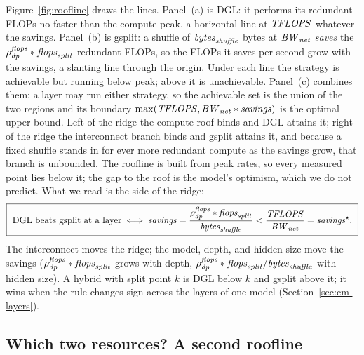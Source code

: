 Figure~\ref{fig:roofline} draws the lines. Panel~(a) is DGL: it performs its redundant FLOPs no
faster than the compute peak, a horizontal line at $\mathit{TFLOPS}$ whatever the savings. Panel~(b) is
gsplit: a shuffle of $\mathit{bytes}_{\mathit{shuffle}}$ bytes at $\mathit{BW}_{\mathit{net}}$ \emph{saves} the $\rho^{\mathit{flops}}_{\mathit{dp}}\ast \mathit{flops}_{\mathit{split}}$ redundant FLOPs, so the FLOPs it
saves per second grow with the savings, a slanting line through the origin. Under each line the
strategy is achievable but running below peak; above it is unachievable. Panel~(c) combines them: a
layer may run either strategy, so the achievable set is the union of the two regions and its boundary
$\max(\mathit{TFLOPS},\mathit{BW}_{\mathit{net}}\ast \mathit{savings})$ is the optimal upper bound. Left of the ridge the compute roof
binds and DGL attains it; right of the ridge the interconnect branch binds and gsplit attains it, and
because a fixed shuffle stands in for ever more redundant compute as the savings grow, that branch
is unbounded. The roofline is built from peak rates, so every measured point lies below it; the
gap to the roof is the model's optimism, which we do not predict. What we read is the side of the
ridge:
\begin{equation}
  \boxed{\ \text{DGL beats gsplit at a layer}\iff
         \mathit{savings}=\frac{\rho^{\mathit{flops}}_{\mathit{dp}}\ast \mathit{flops}_{\mathit{split}}}{\mathit{bytes}_{\mathit{shuffle}}} < \frac{\mathit{TFLOPS}}{\mathit{BW}_{\mathit{net}}}=\mathit{savings}^\star.\ }
  \label{eq:floor-rule}
\end{equation}
The interconnect moves the ridge; the model, depth, and hidden size move the savings ($\rho^{\mathit{flops}}_{\mathit{dp}}\ast \mathit{flops}_{\mathit{split}}$ grows
with depth, $\rho^{\mathit{flops}}_{\mathit{dp}}\ast \mathit{flops}_{\mathit{split}}/\mathit{bytes}_{\mathit{shuffle}}$ with hidden size). A hybrid with split point $k$ is DGL below $k$ and gsplit
above it; it wins when the rule changes sign across the layers of one model
(Section~\ref{sec:cm-layers}).

\subsection{Which two resources? A second roofline}
\label{sec:cm-second}

